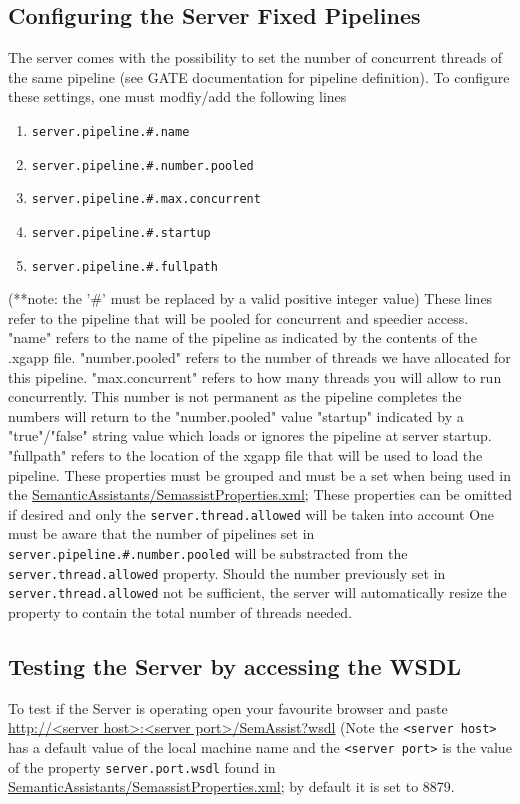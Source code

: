 \subsection{Configuring the Server Fixed Pipelines}
The server comes with the possibility to set the number of concurrent threads
of the same pipeline (see GATE documentation for pipeline definition).  To 
configure these settings, one must modfiy/add the following lines
\begin{enumerate}
\item \texttt{server.pipeline.\#.name}
\item \texttt{server.pipeline.\#.number.pooled}
\item \texttt{server.pipeline.\#.max.concurrent}
\item \texttt{server.pipeline.\#.startup}
\item \texttt{server.pipeline.\#.fullpath}
\end{enumerate}
(**note: the '\#' must be replaced by a valid positive integer value)
These lines refer to the pipeline that will be pooled for concurrent and
speedier access.  
"name" refers to the name of the pipeline as indicated by the contents of the .xgapp file.
"number.pooled" refers to the number of threads we have allocated for this pipeline.
"max.concurrent" refers to how many threads you will allow to run concurrently.  This number is not permanent as the pipeline completes the numbers will return to the "number.pooled" value
"startup" indicated by a "true"/"false" string value which loads or ignores the pipeline at server startup.
"fullpath" refers to the location of the xgapp file that will be used to load the pipeline.
These properties must be grouped and must be a set when being used in the \url{SemanticAssistants/SemassistProperties.xml};
These properties can be omitted if desired and only the \texttt{server.thread.allowed} will be taken into account
One must be aware that the number of pipelines set in \texttt{server.pipeline.\#.number.pooled}
will be substracted from the \texttt{server.thread.allowed} property.  Should the number previously
set in \texttt{server.thread.allowed} not be sufficient, the server will automatically resize the property
to contain the total number of threads needed.

\subsection{Testing the Server by accessing the WSDL}
To test if the Server is operating open your favourite browser and
paste \url{http://<server host>:<server port>/SemAssist?wsdl} (Note
the \texttt{<server host>} has a default value of the local machine
name and the \texttt{<server port>} is the value of the property
\texttt{server.port.wsdl} found in
\url{SemanticAssistants/SemassistProperties.xml}; by default it is set
to 8879.

